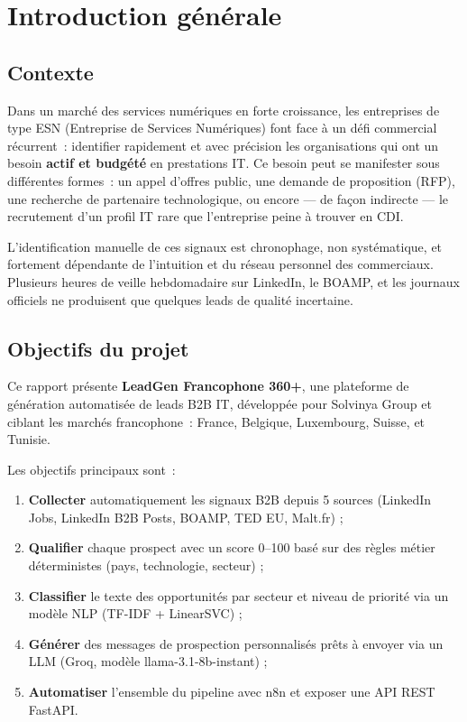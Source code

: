 \chapter*{Introduction générale}

\section*{Contexte}

Dans un marché des services numériques en forte croissance, les entreprises de
type ESN (Entreprise de Services Numériques) font face à un défi commercial
récurrent~: identifier rapidement et avec précision les organisations qui ont un
besoin \textbf{actif et budgété} en prestations IT. Ce besoin peut se manifester
sous différentes formes~: un appel d'offres public, une demande de proposition
(RFP), une recherche de partenaire technologique, ou encore — de façon indirecte
— le recrutement d'un profil IT rare que l'entreprise peine à trouver en CDI.

L'identification manuelle de ces signaux est chronophage, non systématique, et
fortement dépendante de l'intuition et du réseau personnel des commerciaux.
Plusieurs heures de veille hebdomadaire sur LinkedIn, le BOAMP, et les journaux
officiels ne produisent que quelques leads de qualité incertaine.

\section*{Objectifs du projet}

Ce rapport présente \textbf{LeadGen Francophone 360+}, une plateforme de
génération automatisée de leads B2B IT, développée pour Solvinya Group et
ciblant les marchés francophone~: France, Belgique, Luxembourg, Suisse, et
Tunisie.

Les objectifs principaux sont~:
\begin{enumerate}[label=\textbf{\arabic*.}]
  \item \textbf{Collecter} automatiquement les signaux B2B depuis 5 sources
        (LinkedIn Jobs, LinkedIn B2B Posts, BOAMP, TED EU, Malt.fr) ;
  \item \textbf{Qualifier} chaque prospect avec un score 0--100 basé sur des
        règles métier déterministes (pays, technologie, secteur) ;
  \item \textbf{Classifier} le texte des opportunités par secteur et niveau de
        priorité via un modèle NLP (TF-IDF + LinearSVC) ;
  \item \textbf{Générer} des messages de prospection personnalisés prêts à envoyer
        via un LLM (Groq, modèle llama-3.1-8b-instant) ;
  \item \textbf{Automatiser} l'ensemble du pipeline avec n8n et exposer une API
        REST FastAPI.
\end{enumerate}

